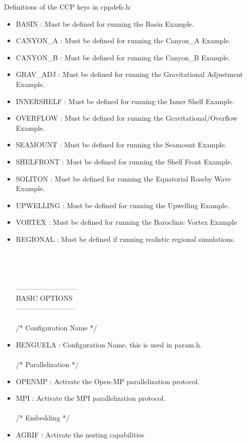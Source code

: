 Definitions of the CCP keys in cppdefs.h:
\begin{itemize}
\item BASIN     : Must be defined for running the Basin Example.
\item CANYON\_A  : Must be defined for running the Canyon\_A Example.
\item CANYON\_B  : Must be defined for running the Canyon\_B Example.
\item GRAV\_ADJ  : Must be defined for running the Gravitational Adjustment Example.
\item INNERSHELF   : Must be defined for running the Inner Shelf Example.
\item OVERFLOW  : Must be defined for running the Gravitational/Overflow Example.
\item SEAMOUNT  : Must be defined for running the Seamount Example.
\item SHELFRONT : Must be defined for running the Shelf Front Example.
\item SOLITON   : Must be defined for running the Equatorial Rossby Wave Example.
\item UPWELLING : Must be defined for running the Upwelling Example.
\item VORTEX    : Must be defined for running the Baroclinic Vortex Example  
\item REGIONAL  : Must be defined if running realistic regional simulations.
\\\\\\\\\\
--------------------------\\
       BASIC OPTIONS \\
--------------------------
\\ \\ /*                       Configuration Name */
\item BENGUELA :  Configuration Name, this is used in param.h.
\\ \\ /*                       Parallelization */
\item OPENMP : Activate the Open-MP parallelization protocol.
\item MPI : Activate the MPI parallelization protocol.
\\ \\ /*                       Embedding */
\item AGRIF : Activate the nesting capabilities

\end{itemize}
